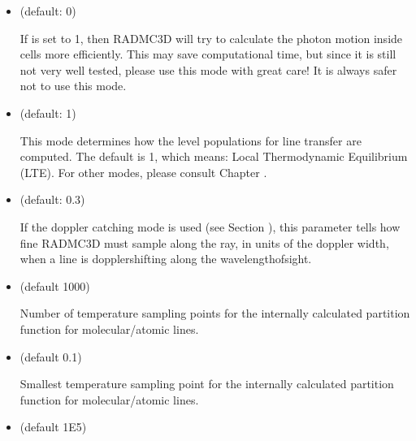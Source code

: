 \documentclass[letterpaper,10pt,english]{sphinxmanual}
\begin{document}
\begin{itemize}
\item {} 
 (default: 0) 

If  is set to 1, then RADMC\sphinxhyphen{}3D will try to
calculate the photon motion inside cells more efficiently. This may
save computational time, but since it is still not very well tested,
please use this mode with great care! It is always safer not to use
this mode.

\item {} 
 (default: 1)

This mode determines how the level populations for line transfer are
computed. The default is 1, which means: Local Thermodynamic Equilibrium
(LTE). For other modes, please consult Chapter {\hyperref[\detokenize{lineradtrans:chap-line-transfer}]{}}.

\item {} 
 (default: 0.3) 

If the doppler catching mode is used (see Section
{\hyperref[\detokenize{lineradtrans:sec-doppler-catching}]{}}), this parameter tells how fine RADMC\sphinxhyphen{}3D
must sample along the ray, in units of the doppler width, when a line is
doppler\sphinxhyphen{}shifting along the wavelength\sphinxhyphen{}of\sphinxhyphen{}sight.

\item {} 
 (default 1000) 

Number of temperature sampling points for the internally calculated
partition function for molecular/atomic lines.

\item {} 
 (default 0.1) 

Smallest temperature sampling point for the internally calculated
partition function for molecular/atomic lines.

\item {} 
 (default 1E5) 


\end{itemize}
\end{document}
